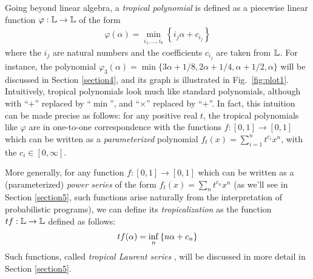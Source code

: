 Going beyond linear algebra, a \emph{tropical polynomial} is defined as a piecewise linear function $\varphi:\mathbb{L}\to \mathbb{L}$ of the form 
\begin{align}\label{eq:polytrop}
\varphi(\alpha)= \min_{i_{1},\dots, i_{k}}\left\{ i_{j}\alpha + c_{i_{j}}\right\}
\end{align}
where the $i_{j}$ are natural numbers and the coefficients $c_{i_{j}}$ are taken from $\mathbb{L}$. For instance, the polynomial
$\varphi_{3}(\alpha)=\min\{ 3\alpha+1/8,2\alpha+1/4, \alpha+1/2, \alpha\}$ will be discussed in Section \ref{section4}, and its graph is illustrated in Fig.~\ref{fig:plot1}.
%
Intuitively, tropical polynomials look much like standard polynomials, although with ``$+$'' replaced by ``$\min$'', and ``$\times$'' replaced by ``$+$''. 
In fact, this intuition can be made precise as follows: for any positive real $t$, the tropical polynomials like $\varphi$ are in one-to-one correspondence with the functions $f:[0,1]\to [0,1]$ which can be written as a \emph{parameterized} polynomial 
$f_{t}(x)= \sum_{i=1}^{n}t^{c_{i}}x^{n}$, with the $c_{i}\in [0,\infty]$. 






More generally, for any function $f:[0,1]\to [0,1]$ which can be written as a (parameterized) \emph{power series} of the form $f_{t}(x)= \sum_{n}t^{c_{n}}x^{n}$ (as we'll see in Section \ref{section5}, such functions arise naturally from the interpretation of probabilistic programs), we can define its \emph{tropicalization} as the function $\trop f: \Lawv \to \Lawv$ defined as follows:
\begin{align}\label{eq:defTLS}
\trop f(\alpha) =\inf_{n}\left\{ n\alpha+c_{n}\right\}
\end{align}
Such functions, called \emph{tropical Laurent series} \cite{Porzio2021}, will be discussed in more detail in Section \ref{section5}.

